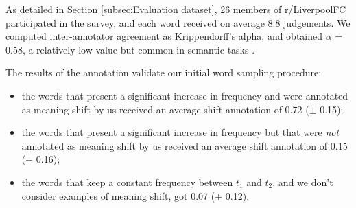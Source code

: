 \documentclass[11pt,a4paper]{article}
\begin{document}
As detailed in Section \ref{subsec:Evaluation dataset}, 26 members of r/LiverpoolFC participated in the survey, and each word received on average 8.8 judgements. We computed inter-annotator agreement as Krippendorff's alpha, and obtained $\alpha$ = 0.58, a relatively low value but common in semantic tasks \cite{artstein2008inter}.

The results of the annotation validate our initial word sampling procedure:

\begin{itemize}
\item  the words that present a significant increase in frequency and were annotated as
meaning shift by us received an average shift annotation of 0.72 ($\pm$ 0.15);
\item the words that present a
significant increase in frequency but that were \emph{not} annotated as
meaning shift by us received an average shift annotation of  0.15 ($\pm$ 0.16);
\item the words that keep a constant frequency between $t_1$ and $t_2$, and we don't consider examples of meaning shift, got 0.07 ($\pm$ 0.12).
\end{itemize}
\end{document}
